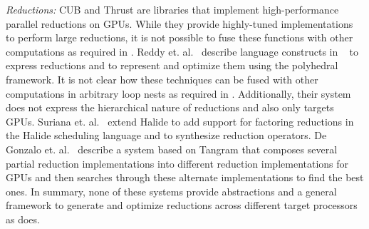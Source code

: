 \emph{Reductions:} CUB\cite{CUB} and Thrust\cite{Thrust} are libraries 
that implement high-performance parallel reductions on GPUs. While they 
provide highly-tuned implementations to perform large reductions, 
it is not possible to fuse these functions with other computations  
as required in \Treebeard{}. Reddy et. al.~\cite{ChandanReduction}
describe language constructs in {}~\cite{Pencil}
to express reductions and to represent and optimize them using the polyhedral 
framework. It is not clear how these techniques can be fused with 
other computations in arbitrary loop nests as required in \Treebeard{}.
Additionally, their system does not express the hierarchical nature of 
reductions and also only targets GPUs. Suriana et. al.~\cite{HalideReductions}
extend Halide to add support for factoring reductions in the Halide 
scheduling language and to synthesize reduction operators. De Gonzalo 
et. al.~\cite{TangramReduction} describe a system based on Tangram 
that composes several partial reduction implementations into different 
reduction implementations for GPUs and then searches through these
alternate implementations to find the best ones. In summary, none of 
these systems provide abstractions and a general framework to generate 
and optimize reductions across different target processors as \Treebeard{} does.